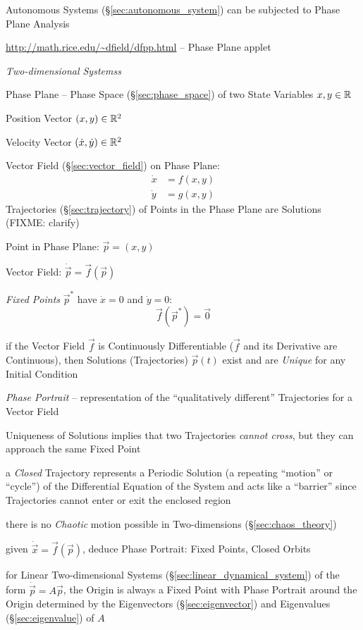
Autonomous Systems (\S\ref{sec:autonomous_system}) can be subjected to Phase
Plane Analysis

\url{http://math.rice.edu/~dfield/dfpp.html} -- Phase Plane applet

\emph{Two-dimensional Systemss}

Phase Plane -- Phase Space (\S\ref{sec:phase_space}) of two State Variables
$x,y \in \mathbb{R}$

Position Vector $(x,y) \in \mathbb{R}^2$

Velocity Vector $(\dot{x},\dot{y}) \in \mathbb{R}^2$

Vector Field (\S\ref{sec:vector_field}) on Phase Plane:
\begin{align*}
  \dot{x} & = f(x,y) \\
  \dot{y} & = g(x,y)
\end{align*}
Trajectories (\S\ref{sec:trajectory}) of Points in the Phase Plane are
Solutions (FIXME: clarify)

Point in Phase Plane: $\vec{p} = (x,y)$

Vector Field: $\dot{\vec{p}} = \vec{f}(\vec{p})$

\emph{Fixed Points} $\vec{p}^*$ have $\dot{x} = 0$ and $\dot{y} = 0$:
\[
  \vec{f}(\vec{p}^*) = \vec{0}
\]

if the Vector Field $\vec{f}$ is Continuously Differentiable ($\vec{f}$ and its
Derivative are Continuous), then Solutions (Trajectories) $\vec{p}(t)$ exist
and are \emph{Unique} for any Initial Condition

\emph{Phase Portrait} -- representation of the ``qualitatively different''
Trajectories for a Vector Field

Uniqueness of Solutions implies that two Trajectories \emph{cannot cross}, but
they can approach the same Fixed Point

a \emph{Closed} Trajectory represents a Periodic Solution (a repeating
``motion'' or ``cycle'') of the Differential Equation of the System and acts
like a ``barrier'' since Trajectories cannot enter or exit the enclosed region

there is no \emph{Chaotic} motion possible in Two-dimensions
(\S\ref{sec:chaos_theory})

given $\dot{\vec{x}} = \vec{f}(\vec{p})$, deduce Phase Portrait: Fixed Points,
Closed Orbits

for Linear Two-dimensional Systems (\S\ref{sec:linear_dynamical_system}) of the
form $\dot{\vec{p}} = A\vec{p}$, the Origin is always a Fixed Point with Phase
Portrait around the Origin determined by the Eigenvectors
(\S\ref{sec:eigenvector}) and Eigenvalues (\S\ref{sec:eigenvalue}) of $A$


